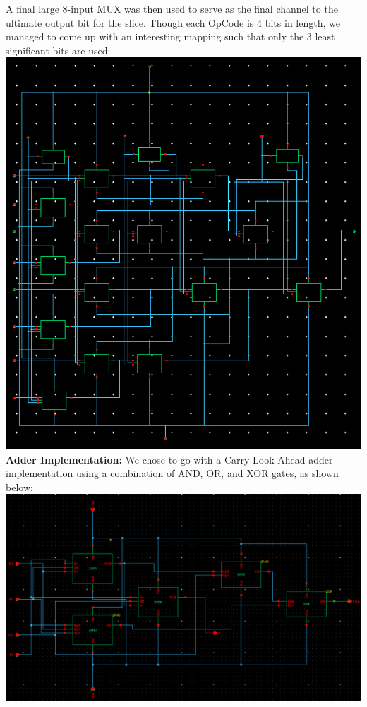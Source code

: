 \documentclass[12pt]{article}
\begin{document}
	\newline \newline
	A final large 8-input MUX was then used to serve as the final channel to the ultimate output 
	bit for the slice. Though each OpCode is 4 bits in length, we managed to come up with an 
	interesting mapping such that only the 3 least significant bits are used:
	\newline \newline
  	\includegraphics[scale=0.4]{8mux.png} \\
	\newline \newline
	\textbf{Adder Implementation:}
	\newline \newline
	We chose to go with a Carry Look-Ahead adder implementation using a combination of AND,
	OR, and XOR gates, as shown below:
	\newline \newline
 	\includegraphics[scale=0.4]{add.png} \\
\end{document}
